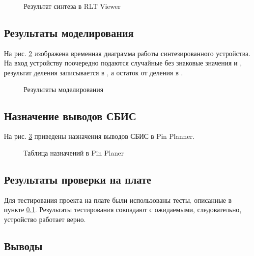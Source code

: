 \begin{figure}[H]
\begin{center}
	\caption{Результат синтеза в RLT Viewer}
	\label{fig:lab3_3_rtl}
\end{center}
\end{figure}

\subsection{Результаты моделирования}
\label{sec:lab3_3_modeling}

На рис. \ref{fig:lab3_3_modeling} изображена временная диаграмма работы синтезированного устройства. На вход устройству поочередно подаются случайные без знаковые значения  и , результат деления записывается в , а остаток от деления в .
\begin{figure}[H]
\begin{center}
	\caption{Результаты моделирования}
	\label{fig:lab3_3_modeling}
\end{center}
\end{figure}

\subsection{Назначение выводов СБИС}

На рис. \ref{fig:lab3_3_pins} приведены назначения выводов СБИС в Pin Planner.

\begin{figure}[H]
\begin{center}
	\caption{Таблица назначений в Pin Planer}
	\label{fig:lab3_3_pins}
\end{center}
\end{figure}

\subsection{Результаты проверки на плате}

Для тестирования проекта на плате были использованы тесты, описанные в пункте \ref{sec:lab3_3_modeling}. Результаты тестирования совпадают с ожидаемыми, следовательно, устройство работает верно.

\subsection{Выводы}


